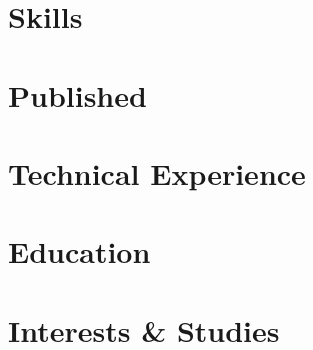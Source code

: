 \documentclass[letter,14pt]{article}
\begin{document}
\thispagestyle{fancy}
\pagestyle{empty} 



\section{Skills}


\section{Published}


\section{Technical Experience}


\newpage
\setlength{\headheight}{0pt}
\setlength{\headsep}{20pt}

\section{Education}


\section{Interests \& Studies}

\end{document}
